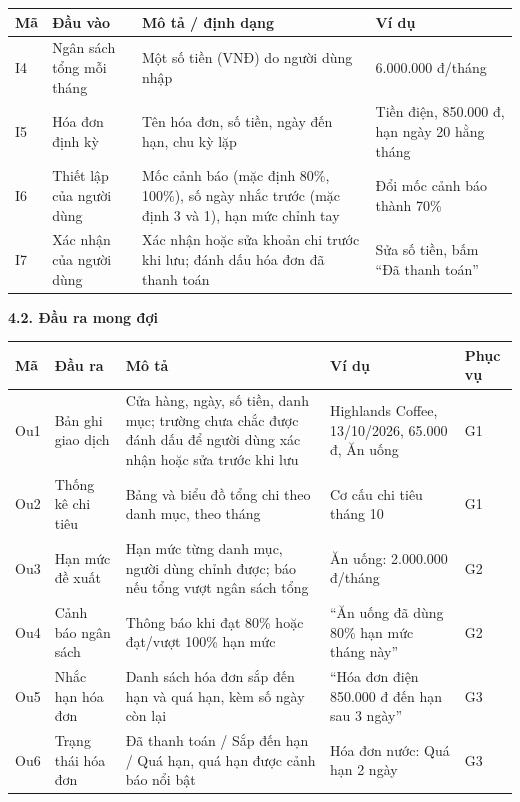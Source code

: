 \documentclass[a4paper,14pt]{extarticle}
\renewcommand{\arraystretch}{1.08}
\newcommand{\TableText}{\footnotesize}
\newcommand{\TableStart}{%
    \begingroup
    \TableText
    \renewcommand{\arraystretch}{1.05}
}
\newcommand{\TableEnd}{\endgroup}
\begin{document}
\TableStart
\begingroup
\normalsize
\begin{tabularx}{\textwidth}{
    |P{0.8cm}|P{3.0cm}|P{6.1cm}|Y|
}
\hline
\textbf{Mã}
& \textbf{Đầu vào}
& \textbf{Mô tả / định dạng}
& \textbf{Ví dụ}
\\
\hline
I4
& Ngân sách tổng mỗi tháng
& Một số tiền (VNĐ) do người dùng nhập
& 6.000.000 đ/tháng
\\
\hline
I5
& Hóa đơn định kỳ
& Tên hóa đơn, số tiền, ngày đến hạn, chu kỳ lặp
& Tiền điện, 850.000 đ, hạn ngày 20 hằng tháng
\\
\hline
I6
& Thiết lập của người dùng
& Mốc cảnh báo (mặc định 80\%, 100\%), số ngày nhắc trước (mặc định 3 và 1), hạn mức chỉnh tay
& Đổi mốc cảnh báo thành 70\%
\\
\hline
I7
& Xác nhận của người dùng
& Xác nhận hoặc sửa khoản chi trước khi lưu; đánh dấu hóa đơn đã thanh toán
& Sửa số tiền, bấm ``Đã thanh toán''
\\
\hline
\end{tabularx}
\endgroup
\TableEnd

\vspace{0.5cm}

{\normalsize\bfseries 4.2. Đầu ra mong đợi}

\TableStart
\begingroup
\normalsize
\begin{tabularx}{\textwidth}{
    |P{1cm}|P{2.5cm}|P{7cm}|P{4.5cm}|Y|
}
\hline
\textbf{Mã}
& \textbf{Đầu ra}
& \textbf{Mô tả}
& \textbf{Ví dụ}
& \textbf{Phục vụ}
\\
\hline
Ou1
& Bản ghi giao dịch
& Cửa hàng, ngày, số tiền, danh mục; trường chưa chắc được đánh dấu để người dùng xác nhận hoặc sửa trước khi lưu
& Highlands Coffee, 13/10/2026, 65.000 đ, Ăn uống
& G1
\\
\hline
Ou2
& Thống kê chi tiêu
& Bảng và biểu đồ tổng chi theo danh mục, theo tháng
& Cơ cấu chi tiêu tháng 10
& G1
\\
\hline
Ou3
& Hạn mức đề xuất
& Hạn mức từng danh mục, người dùng chỉnh được; báo nếu tổng vượt ngân sách tổng
& Ăn uống: 2.000.000 đ/tháng
& G2
\\
\hline
Ou4
& Cảnh báo ngân sách
& Thông báo khi đạt 80\% hoặc đạt/vượt 100\% hạn mức
& ``Ăn uống đã dùng 80\% hạn mức tháng này''
& G2
\\
\hline
Ou5
& Nhắc hạn hóa đơn
& Danh sách hóa đơn sắp đến hạn và quá hạn, kèm số ngày còn lại
& ``Hóa đơn điện 850.000 đ đến hạn sau 3 ngày''
& G3
\\
\hline
Ou6
& Trạng thái hóa đơn
& Đã thanh toán / Sắp đến hạn / Quá hạn, quá hạn được cảnh báo nổi bật
& Hóa đơn nước: Quá hạn 2 ngày
& G3
\\
\hline
\end{tabularx}
\endgroup
\TableEnd
\end{document}
